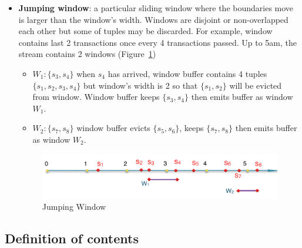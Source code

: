 \begin{itemize}
\item \textbf{Jumping window}: a particular sliding window where the boundaries move is larger than the window's width. Windows are disjoint or non-overlapped each other but some of tuples may be discarded. For example, window contains last 2 transactions once every 4 transactions passed. Up to 5am, the stream contains 2 windows (Figure~\ref{fig:jumpingWin})
\begin{itemize}
\item $W_1:\{s_3,s_4\}$ when $s_4$ has arrived, window buffer contains 4 tuples $\{s_1,s_2,s_3,s_4\}$ but window's width is 2 so that $\{s_1,s_2\}$ will be evicted from window. Window buffer keeps $\{s_3,s_4\}$ then emits buffer as window $W_1$.
\item $W_2:\{s_7, s_8\}$ window buffer evicts $\{s_5,s_6\}$, keeps $\{s_7,s_8\}$ then emits buffer as window $W_2$.
\end{itemize}

\begin{figure}[htbp!] 
\centering    
\includegraphics[width=1\textwidth]{jumpingWin}
\caption{Jumping Window}
\label{fig:jumpingWin}
\end{figure}


\end{itemize}


\subsection{Definition of contents} 

